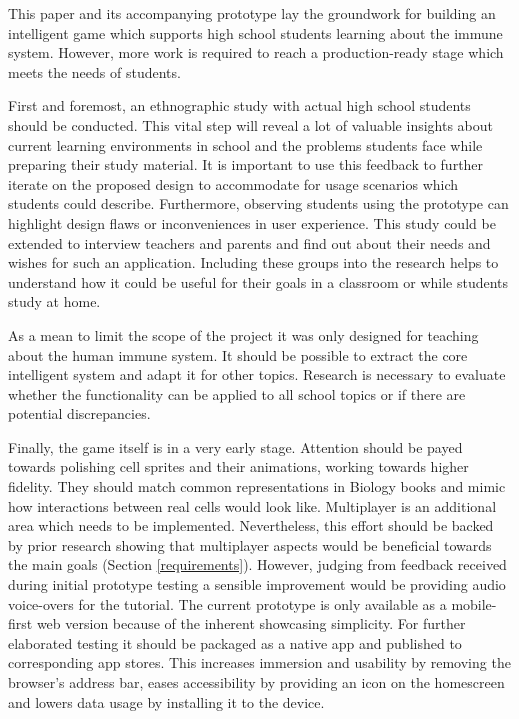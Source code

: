This paper and its accompanying prototype lay the groundwork for building an intelligent game which supports high school students learning about the immune system. However, more work is required to reach a production-ready stage which meets the needs of students.

First and foremost, an ethnographic study with actual high school students should be conducted. This vital step will reveal a lot of valuable insights about current learning environments in school and the problems students face while preparing their study material. It is important to use this feedback to further iterate on the proposed design to accommodate for usage scenarios which students could describe. Furthermore, observing students using the prototype can highlight design flaws or inconveniences in user experience.
This study could be extended to interview teachers and parents and find out about their needs and wishes for such an application. Including these groups into the research helps to understand how it could be useful for their goals in a classroom or while students study at home.

As a mean to limit the scope of the project it was only designed for teaching about the human immune system. It should be possible to extract the core intelligent system and adapt it for other topics. Research is necessary to evaluate whether the functionality can be applied to all school topics or if there are potential discrepancies.

Finally, the game itself is in a very early stage. Attention should be payed towards polishing cell sprites and their animations, working towards higher fidelity. They should match common representations in Biology books and mimic how interactions between real cells would look like. Multiplayer is an additional area which needs to be implemented. Nevertheless, this effort should be backed by prior research showing that multiplayer aspects would be beneficial towards the main goals (Section \ref{requirements}). However, judging from feedback received during initial prototype testing a sensible improvement would be providing audio voice-overs for the tutorial. The current prototype is only available as a mobile-first web version because of the inherent showcasing simplicity. For further elaborated testing it should be packaged as a native app and published to corresponding app stores. This increases immersion and usability by removing the browser's address bar, eases accessibility by providing an icon on the homescreen and lowers data usage by installing it to the device.

